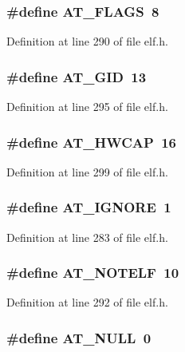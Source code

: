 \subsubsection[{AT\_\-FLAGS}]{\setlength{\rightskip}{0pt plus 5cm}\#define AT\_\-FLAGS~8}\label{elf_8h_08c6bdc11224c9d17fbde19666c332cc}




Definition at line 290 of file elf.h.
\subsubsection[{AT\_\-GID}]{\setlength{\rightskip}{0pt plus 5cm}\#define AT\_\-GID~13}\label{elf_8h_38d3d729013f2b2c5f51f90b0005e85d}




Definition at line 295 of file elf.h.
\subsubsection[{AT\_\-HWCAP}]{\setlength{\rightskip}{0pt plus 5cm}\#define AT\_\-HWCAP~16}\label{elf_8h_9765fa7aea5ad0e782d28c45630cce27}




Definition at line 299 of file elf.h.
\subsubsection[{AT\_\-IGNORE}]{\setlength{\rightskip}{0pt plus 5cm}\#define AT\_\-IGNORE~1}\label{elf_8h_b11dfd4fb71c15a128c3f70a310b53d1}




Definition at line 283 of file elf.h.
\subsubsection[{AT\_\-NOTELF}]{\setlength{\rightskip}{0pt plus 5cm}\#define AT\_\-NOTELF~10}\label{elf_8h_9c46c7e4fc9e72e4c1041296ce2e805b}




Definition at line 292 of file elf.h.
\subsubsection[{AT\_\-NULL}]{\setlength{\rightskip}{0pt plus 5cm}\#define AT\_\-NULL~0}\label{elf_8h_a893f7231479240d49c660c5649cac5b}




